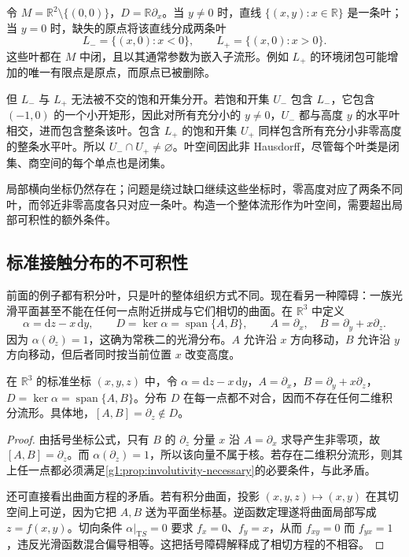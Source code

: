 \begin{example}
	\label{g1:exm:punctured-plane-leaf-space}
	令 \(M=\mathbb R^2\setminus\{(0,0)\}\)，\(D=\mathbb R\partial_x\)。当 \(y\neq0\) 时，直线 \(\{(x,y):x\in\mathbb R\}\) 是一条叶；当 \(y=0\) 时，缺失的原点将该直线分成两条叶
	\[
		L_- =\{(x,0):x<0\},\qquad L_+=\{(x,0):x>0\}.
	\]
	这些叶都在 \(M\) 中闭，且以其通常参数为嵌入子流形。例如 \(L_+\) 的环境闭包可能增加的唯一有限点是原点，而原点已被删除。

	但 \(L_-\) 与 \(L_+\) 无法被不交的饱和开集分开。若饱和开集 \(U_-\) 包含 \(L_-\)，它包含 \((-1,0)\) 的一个小开矩形，因此对所有充分小的 \(y\neq0\)，\(U_-\) 都与高度 \(y\) 的水平叶相交，进而包含整条该叶。包含 \(L_+\) 的饱和开集 \(U_+\) 同样包含所有充分小非零高度的整条水平叶。所以 \(U_-\cap U_+\neq\varnothing\)。叶空间因此非 Hausdorff，尽管每个叶类是闭集、商空间的每个单点也是闭集。
\end{example}

局部横向坐标仍然存在；问题是绕过缺口继续这些坐标时，零高度对应了两条不同叶，而邻近非零高度各只对应一条叶。构造一个整体流形作为叶空间，需要超出局部可积性的额外条件。

\subsection{标准接触分布的不可积性}
\label{g1:subsec:1305:04}

前面的例子都有积分叶，只是叶的整体组织方式不同。现在看另一种障碍：一族光滑平面甚至不能在任何一点附近拼成与它们相切的曲面。在 \(\mathbb R^3\) 中定义
\[
	\alpha=\mathrm{d}z-x\,\mathrm{d}y,\qquad
	D=\ker\alpha
	=\operatorname{span}\{A,B\},\qquad
	A=\partial_x,\quad B=\partial_y+x\partial_z.
\]
因为 \(\alpha(\partial_z)=1\)，这确为常秩二的光滑分布。\(A\) 允许沿 \(x\) 方向移动，\(B\) 允许沿 \(y\) 方向移动，但后者同时按当前位置 \(x\) 改变高度。

\begin{proposition}
	\label{g1:prop:contact-model-nonintegrable}
	在 \(\mathbb R^3\) 的标准坐标 \((x,y,z)\) 中，令 \(\alpha=\mathrm{d}z-x\,\mathrm{d}y\)，\(A=\partial_x\)，\(B=\partial_y+x\partial_z\)，\(D=\ker\alpha=\operatorname{span}\{A,B\}\)。分布 \(D\) 在每一点都不对合，因而不存在任何二维积分流形。具体地，\([A,B]=\partial_z\notin D\)。
\end{proposition}
\begin{proof}
	由括号坐标公式，只有 \(B\) 的 \(\partial_z\) 分量 \(x\) 沿 \(A=\partial_x\) 求导产生非零项，故 \([A,B]=\partial_z\)。而 \(\alpha(\partial_z)=1\)，所以该向量不属于核。若存在二维积分流形，则其上任一点都必须满足\cref{g1:prop:involutivity-necessary}的必要条件，与此矛盾。

	还可直接看出曲面方程的矛盾。若有积分曲面，投影 \((x,y,z)\mapsto(x,y)\) 在其切空间上可逆，因为它把 \(A,B\) 送为平面坐标基。逆函数定理遂将曲面局部写成 \(z=f(x,y)\)。切向条件 \(\alpha|_{\mathrm{T}S}=0\) 要求 \(f_x=0\)、\(f_y=x\)，从而 \(f_{xy}=0\) 而 \(f_{yx}=1\)，违反光滑函数混合偏导相等。这把括号障碍解释成了相切方程的不相容。
\end{proof}

